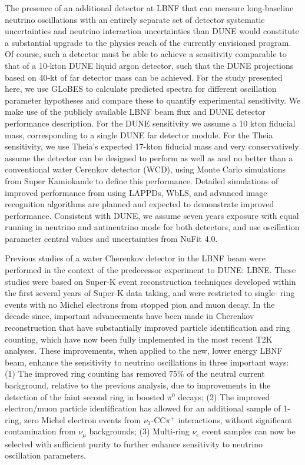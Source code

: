 The presence of an additional detector at LBNF that can measure long-baseline neutrino oscillations with an
entirely separate set of detector systematic uncertainties and neutrino interaction uncertainties than
DUNE would constitute a substantial upgrade to the physics reach of the currently envisioned program.
Of course, such a detector must be able to achieve a sensitivity comparable to that of a 10-kton DUNE liquid
argon detector, such that the DUNE projections\cite{DUNECDR} based on 40-kt of far detector mass can be achieved.
For the study presented here, we use GLoBES\cite{globes} to calculate predicted spectra for different
oscillation parameter hypotheses and compare these to quantify experimental sensitivity. We make use of
the publicly available LBNF beam flux and DUNE detector performance description\cite{DUNE_configs}. For the DUNE
sensitivity we assume a 10 kton fiducial mass, corresponding to a single DUNE far detector module. For the
Theia sensitivity, we use Theia’s expected 17-kton fiducial mass and very conservatively assume the detector
can be designed to perform as well as and no better than a conventional water Cerenkov detector (WCD), using
Monte Carlo simulations from Super Kamiokande to define this performance. Detailed simulations of improved
performance from using LAPPDs, WbLS, and advanced image recognition algorithms are planned and expected to
demonstrate improved performance. Consistent with DUNE, we assume seven years exposure with equal running
in neutrino and
antineutrino mode for both detectors, and use oscillation parameter central values and uncertainties
from NuFit 4.0\cite{nufit4}.

Previous studies of a water Cherenkov detector in the LBNF beam were performed in the context of the
predecessor experiment to DUNE: LBNE\cite{lbne}. These studies were based on Super-K event reconstruction techniques
developed within the first several years of Super-K data taking, and were restricted to single- ring events with
no Michel electrons from stopped pion and muon decay. In the decade since, important advancements have been made in
Cherenkov reconstruction that have substantially improved particle identification and ring counting, which have
now been fully implemented in the most recent T2K analyses\cite{t2k}. These improvements, when applied to the
new, lower energy LBNF beam, enhance the sensitivity to neutrino oscillations in three important ways: (1)
The improved ring counting has removed 75\% of the neutral current background, relative to the previous analysis,
due to improvements in the detection of the faint second ring in boosted $\pi^{0}$ decays;
(2) The improved electron/muon
particle identification has allowed for an additional sample of 1-ring, zero Michel electron events
from $\nu_{3}$-CC$\pi^{+}$ interactions, without significant contamination from $\nu_{\mu}$ backgrounds; (3)
Multi-ring $\nu_{e}$ event samples can now be selected with sufficient purity to further enhance sensitivity to
neutrino oscillation parameters.

